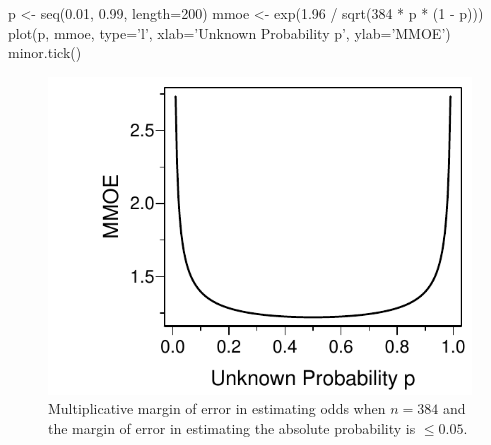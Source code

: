 \begin{Schunk}
\begin{Sinput}
p <- seq(0.01, 0.99, length=200)
mmoe <- exp(1.96 / sqrt(384 * p * (1 - p)))
plot(p, mmoe, type='l', xlab='Unknown Probability p', ylab='MMOE')
minor.tick()
\end{Sinput}
\begin{figure}[htbp]

\centerline{\includegraphics[width=\maxwidth]{htest-moeor-1} }

\caption[Multiplicative margin of error in estimating odds when $n=384$ and the margin of error in estimating the absolute probability is $\leq 0.05$]{Multiplicative margin of error in estimating odds when $n=384$ and the margin of error in estimating the absolute probability is $\leq 0.05$.}\label{fig:htest-moeor}
\end{figure}
\end{Schunk}

